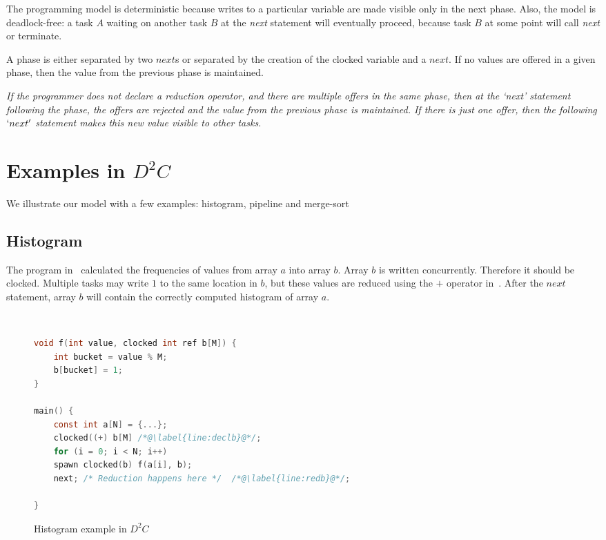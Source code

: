 \documentclass[10pt, conference, compsocconf]{IEEEtran}
\begin{document}
\begin{lstlisting}

\end{lstlisting}

The programming model is deterministic because writes to a particular variable
are made visible only in the next phase. Also, the model is deadlock-free: a task $A$ waiting on another task $B$ at the \emph{next} statement will eventually
proceed, because task $B$ at some point will call \emph{next} or terminate.

A phase is either separated by two $next$s or separated
by the creation of the clocked variable and a $next$.
If no values are offered in a given phase, then the value from
the previous phase is maintained.

{\it If the programmer does not declare a reduction operator, and there are multiple offers in the same phase, then  at the `next' statement following
the phase, the offers are rejected and the value from
the previous phase is maintained. If there is just one offer, then the following $`next'$ statement makes this new value visible to other tasks.}


\section{Examples in $D^2C$}
\label{sec:examples}
We illustrate our model with a few examples: 
histogram, pipeline and merge-sort

\subsection{Histogram}
The program in~ calculated the frequencies
of values from array $a$ 
into array $b$.
Array $b$ is written concurrently. Therefore it should be clocked.
Multiple tasks may write $1$ to the same location in $b$, but these
values are reduced using the $+$ operator in~. After the 
$next$ statement, array $b$ will contain the correctly computed histogram
of array $a$. 

\
\begin{figure}
\begin{lstlisting}[language=C]
void f(int value, clocked int ref b[M]) {
    int bucket = value % M;
    b[bucket] = 1; 
}

main() {
    const int a[N] = {...};
    clocked((+) b[M] /*@\label{line:declb}@*/;
    for (i = 0; i < N; i++)
	spawn clocked(b) f(a[i], b); 
    next; /* Reduction happens here */  /*@\label{line:redb}@*/;

}
\end{lstlisting}
\caption{Histogram example in $D^2C$}
\label{fig:histogram}
\end{figure}
\end{document}
